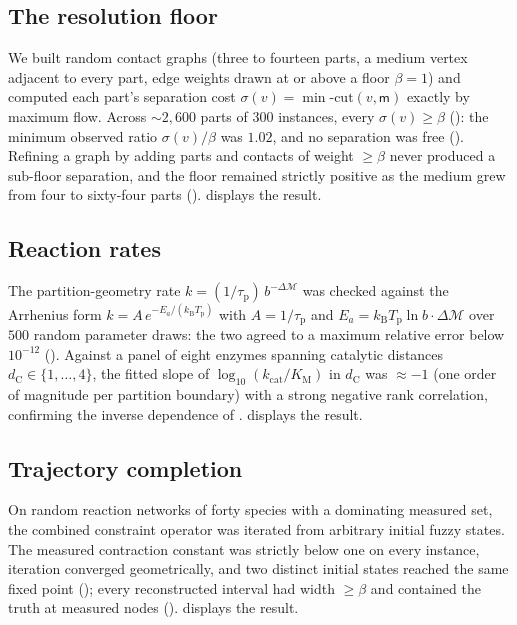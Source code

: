 \documentclass[11pt,twocolumn,a4paper]{article}
\theoremstyle{thmstyle}
\theoremstyle{definition}
\theoremstyle{remark}
\newcommand{\kB}{k_{\mathrm{B}}}
\newcommand{\Depth}{\mathcal{M}}
\newcommand{\dC}{d_{\mathrm{C}}}
\newcommand{\floorc}{\beta}
\newcommand{\med}{\mathsf{m}}
\newcommand{\taup}{\tau_{\mathrm{p}}}
\begin{document}
\subsection{The resolution floor}

We built random contact graphs (three to fourteen parts, a medium vertex
adjacent to every part, edge weights drawn at or above a floor
$\floorc=1$) and computed each part's separation cost
$\sigma(v)=\min\text{-cut}(v,\med)$ exactly by maximum flow. Across
$\sim\!2{,}600$ parts of $300$ instances, every $\sigma(v)\ge\floorc$
(): the minimum observed ratio $\sigma(v)/\floorc$ was
$1.02$, and no separation was free (). Refining a graph
by adding parts and contacts of weight $\ge\floorc$ never produced a
sub-floor separation, and the floor remained strictly positive as the
medium grew from four to sixty-four parts ().
 displays the result.



\subsection{Reaction rates}

The partition-geometry rate $k=(1/\taup)\,b^{-\Delta\Depth}$ was checked
against the Arrhenius form $k=A\,e^{-E_a/(\kB T_{\mathrm p})}$ with
$A=1/\taup$ and $E_a=\kB T_{\mathrm p}\ln b\cdot\Delta\Depth$ over $500$
random parameter draws: the two agreed to a maximum relative error below
$10^{-12}$ (). Against a panel of eight enzymes spanning
catalytic distances $\dC\in\{1,\dots,4\}$, the fitted slope of
$\log_{10}(k_{\mathrm{cat}}/K_{\mathrm M})$ in $\dC$ was $\approx-1$ (one
order of magnitude per partition boundary) with a strong negative rank
correlation, confirming the inverse dependence of .
 displays the result.


\subsection{Trajectory completion}

On random reaction networks of forty species with a dominating measured
set, the combined constraint operator was iterated from arbitrary initial
fuzzy states. The measured contraction constant was strictly below one on
every instance, iteration converged geometrically, and two distinct
initial states reached the same fixed point (); every
reconstructed interval had width $\ge\floorc$ and contained the truth at
measured nodes ().  displays the
result.
\end{document}

